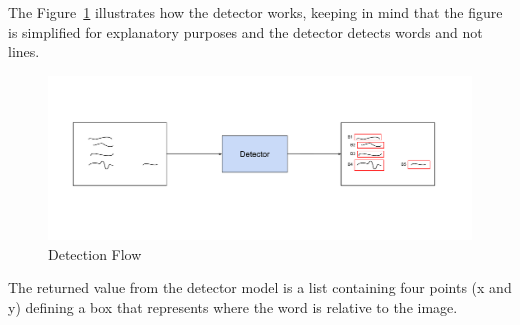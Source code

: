 The Figure~\ref{fig:Detector} illustrates how the detector works, keeping in mind that the figure is simplified for explanatory purposes and the detector detects words and not lines.

\begin{figure}[!ht]
	\centering
	\includegraphics[trim={2cm 3cm 0 1cm}, width=1.1\textwidth]{./Chapter5/Figures/Detector}
	\caption{Detection Flow}
	\label{fig:Detector}
\end{figure}

The returned value from the detector model is a list containing four points (x and y) defining a box that represents where the word is relative to the image.


